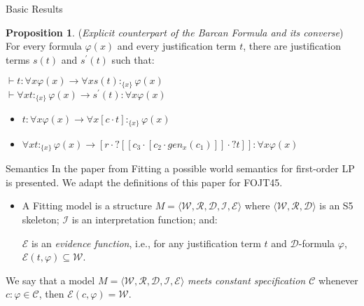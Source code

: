 \documentclass{beamer}
\theoremstyle{definition}
\newtheorem{pro}{Proposition}
\newcommand{\C}{\mathcal{C}}
\newcommand{\D}{\mathcal{D}}
\newcommand{\W}{\mathcal{W}}
\newcommand{\R}{\mathcal{R}}
\newcommand{\E}{\mathcal{E}}
\newcommand{\I}{\mathcal{I}}
\newcommand{\Fmodel}{\bl\W,\R,\D,\I,\E \br}
\newcommand{\p}{^{\prime}}
\newcommand{\impli}{\rightarrow}
\newcommand{\todo}{\forall}
\newcommand{\teo}{\vdash}
\newcommand{\bl}{\langle}
\newcommand{\br}{\rangle}
\begin{document}
	
	
	
\begin{frame}{Basic Results}
	
\begin{pro}
	(\textit{Explicit counterpart of the Barcan Formula and its converse}) For every formula $\varphi(x)$ and every justification term $t$, there are justification terms $s(t)$ and $s\p(t)$ such that: 
	\begin{center}
		$\teo t$$:$$\todo x \varphi(x) \impli \todo x s(t)$$:_{\{x\}}$$\varphi(x)$\\
		\vspace{2 mm}
		$\teo \todo x t$$:_{\{x\}}$$\varphi(x) \impli s\p(t)$$:$$\todo x \varphi(x)$
	\end{center}
\end{pro}	
\vspace{2 mm}
\begin{itemize}
\item<2-> $t:\todo x \varphi (x) \impli \todo x [c \cdot t]$$:_{\{x\}} \varphi(x)$
\vspace{2 mm}
\item<3-> $\todo x t$$:_{\{x\}}$$\varphi(x) \impli[r \cdot ?[[c_{3} \cdot [c_{2} \cdot gen_{x}(c_{1})]]\cdot ?t]]$$:\todo x \varphi(x)$   		
\end{itemize}


\end{frame}	
	

	

\begin{frame}{Semantics}
\qquad In the paper from Fitting \cite{Fitting14} a possible world semantics for first-order LP is presented. We adapt the definitions of this paper for FOJT45.\\
\vspace{5mm}	
\begin{itemize}
\item  A {\color{blue} Fitting model} is a structure $M = \Fmodel$ where $\bl \W, \R, \D \br$ is an S5 skeleton; $\I$ is an interpretation function; and:

\begin{center}
	$\E$ is an \textit{evidence function}, i.e., for any justification term $t$ and $\D$-formula $\varphi$, $\E(t,\varphi) \subseteq \W$.
\end{center}	
\end{itemize}	
	
\qquad We say that a model $M = \Fmodel$ \textit{meets constant specification $\C$} whenever $c$$:$$\varphi \in \C$, then $\E (c, \varphi) = \W$.

\end{frame}
	
\end{document}
